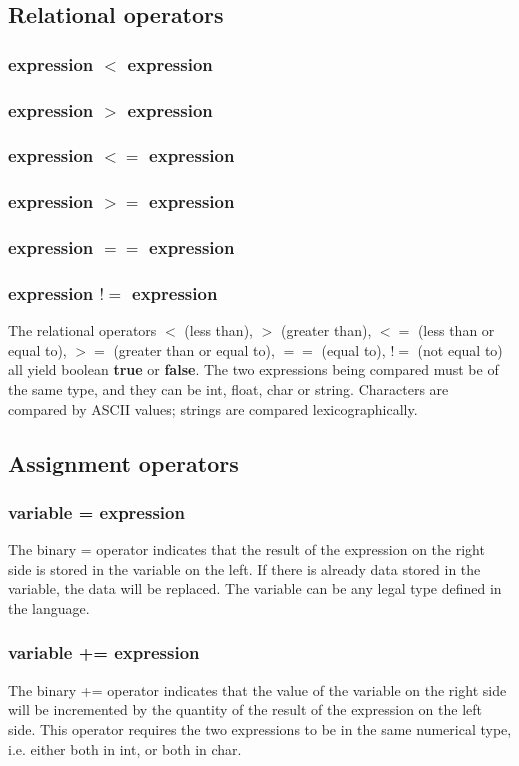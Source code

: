 \documentclass[a4paper,12pt]{article}
\begin{document}
\subsection{Relational operators}
\subsubsection{expression $<$ expression}
\subsubsection{expression $>$ expression}
\subsubsection{expression $<=$ expression}
\subsubsection{expression $>=$ expression}
\subsubsection{expression $==$ expression}
\subsubsection{expression $!=$ expression}
The relational operators $<$ (less than), $>$ (greater than), $<=$ (less than or equal to), $>=$ (greater than or equal to), $==$ (equal to), $!=$ (not equal to) all yield boolean \textbf{true} or \textbf{false}. The two expressions being compared must be of the same type, and they can be int, float, char or string. Characters are compared by ASCII values; strings are compared lexicographically.
\subsection{Assignment operators}
\subsubsection{variable = expression}
The binary = operator indicates that the result of the expression on the right side is stored in the variable on the left. If there is already data stored in the variable, the data will be replaced. The variable can be any legal type defined in the language.
\subsubsection{variable += expression}
The binary += operator indicates that the value of the variable on the right side will be incremented by the quantity of the result of the expression on the left side. This operator requires the two expressions to be in the same numerical type, i.e. either both in int, or both in char.
\end{document}
